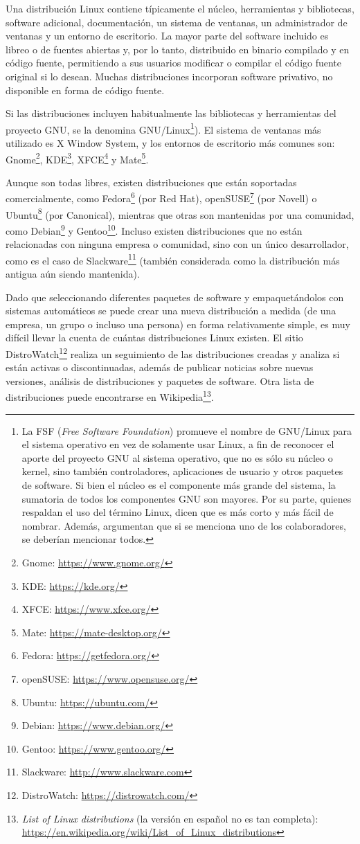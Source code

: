 Una distribución Linux contiene típicamente el núcleo, herramientas y bibliotecas, software adicional, documentación, un sistema de ventanas, un administrador de ventanas y un entorno de escritorio. La mayor parte del software incluido es libreo o de fuentes abiertas y, por lo tanto, distribuido en binario compilado y en código fuente, permitiendo a sus usuarios modificar o compilar el código fuente original si lo desean. Muchas distribuciones incorporan software privativo, no disponible en forma de código fuente.

Si las distribuciones incluyen habitualmente las bibliotecas y herramientas del proyecto GNU, se la denomina GNU/Linux\footnote{La FSF (\textit{Free Software Foundation}) promueve el nombre de GNU/Linux para el sistema operativo en vez de solamente usar Linux, a fin de reconocer el aporte del proyecto GNU al sistema operativo, que no es sólo su núcleo o kernel, sino también controladores, aplicaciones de usuario y otros paquetes de software. Si bien el núcleo es el componente más grande del sistema, la sumatoria de todos los componentes GNU son mayores. Por su parte, quienes respaldan el uso del término Linux, dicen que es más corto y más fácil de nombrar. Además, argumentan que si se menciona uno de los colaboradores, se deberían mencionar todos.}). El sistema de ventanas más utilizado es X Window System, y los entornos de escritorio más comunes son: Gnome\footnote{Gnome: \url{https://www.gnome.org/}}, KDE\footnote{KDE: \url{https://kde.org/}}, XFCE\footnote{XFCE: \url{https://www.xfce.org/}} y Mate\footnote{Mate: \url{https://mate-desktop.org/}}.

Aunque son todas libres, existen distribuciones que están soportadas comercialmente, como Fedora\footnote{Fedora: \url{https://getfedora.org/}} (por Red Hat), openSUSE\footnote{openSUSE: \url{https://www.opensuse.org/}} (por Novell) o Ubuntu\footnote{Ubuntu: \url{https://ubuntu.com/}} (por Canonical), mientras que otras son mantenidas por una comunidad, como Debian\footnote{Debian: \url{https://www.debian.org/}} y Gentoo\footnote{Gentoo: \url{https://www.gentoo.org/}}. Incluso existen distribuciones que no están relacionadas con ninguna empresa o comunidad, sino con un único desarrollador, como es el caso de Slackware\footnote{Slackware: \url{http://www.slackware.com}} (también considerada como la distribución más antigua aún siendo mantenida).

Dado que seleccionando diferentes paquetes de software y empaquetándolos con sistemas automáticos se puede crear una nueva distribución a medida (de una empresa, un grupo o incluso una persona) en forma relativamente simple, es muy difícil llevar la cuenta de cuántas distribuciones Linux existen. El sitio DistroWatch\footnote{DistroWatch: \url{https://distrowatch.com/}} realiza un seguimiento de las distribuciones creadas y analiza si están activas o discontinuadas, además de publicar noticias sobre nuevas versiones, análisis de distribuciones y paquetes de software. Otra lista de distribuciones puede encontrarse en Wikipedia\footnote{\emph{List of Linux distributions} (la versión en español no es tan completa): \url{https://en.wikipedia.org/wiki/List_of_Linux_distributions}}.

